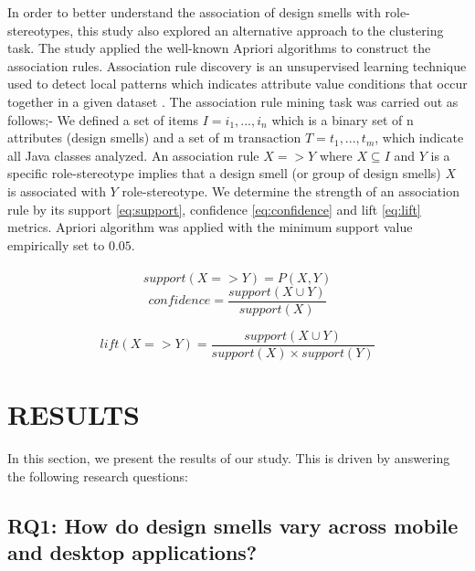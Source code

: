\documentclass[AMA,Times1COL]{WileyNJDv5} %
\begin{document}
	In order to better understand the association of design smells with role-stereotypes, this study also explored an alternative approach to the clustering task. The study applied the well-known Apriori algorithms \cite{agrawal1996fast} to construct the association rules. Association rule discovery is an unsupervised learning technique used to detect local patterns which indicates attribute value conditions that occur together in a given dataset \cite{al2014improved}. The association rule mining task was carried out as follows;- We defined a set of items $I={i_1,...,i_n}$ which is a binary set of n attributes (design smells) and a set of m transaction $T={t_1,...,t_m}$, which indicate all Java classes analyzed. An association rule $X => Y$ where $X \subseteq I$ and $Y$ is a specific role-stereotype implies that a design smell (or group of design smells) $X$ is associated with $Y$ role-stereotype.  We determine the strength of an association rule by its support \ref{eq:support}, confidence \ref{eq:confidence} and lift \ref{eq:lift} metrics. Apriori algorithm was applied with the minimum support value empirically set to $0.05$.
	\\~\\
	\begin{equation}
		support (X => Y) = P (X, Y)\label{eq:support}
	\end{equation}
	\begin{equation}
		confidence = 	\frac{support (X \cup Y)}{support (X)} \label{eq:confidence}
	\end{equation}
	
	\begin{equation}
		lift (X => Y) = \frac{support (X \cup Y)}{support (X) \times support (Y)} \label{eq:lift}
	\end{equation}

	
	\section{RESULTS}\label{sec:result}
	
	In this section, we present the results of our study. This is driven by answering the following research questions:
	\subsection*{RQ1: How do design smells vary across mobile and desktop applications? }
	
\end{document}
